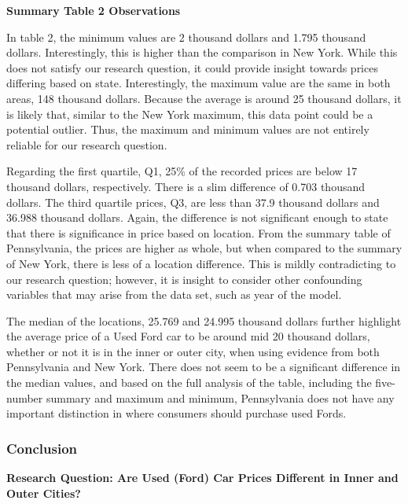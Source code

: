 \documentclass[
]{article}
\begin{document}
\textbf{Summary Table 2 Observations}

In table 2, the minimum values are 2 thousand dollars and 1.795 thousand
dollars. Interestingly, this is higher than the comparison in New York.
While this does not satisfy our research question, it could provide
insight towards prices differing based on state. Interestingly, the
maximum value are the same in both areas, 148 thousand dollars. Because
the average is around 25 thousand dollars, it is likely that, similar to
the New York maximum, this data point could be a potential outlier.
Thus, the maximum and minimum values are not entirely reliable for our
research question.

Regarding the first quartile, Q1, 25\% of the recorded prices are below
17 thousand dollars, respectively. There is a slim difference of 0.703
thousand dollars. The third quartile prices, Q3, are less than 37.9
thousand dollars and 36.988 thousand dollars. Again, the difference is
not significant enough to state that there is significance in price
based on location. From the summary table of Pennsylvania, the prices
are higher as whole, but when compared to the summary of New York, there
is less of a location difference. This is mildly contradicting to our
research question; however, it is insight to consider other confounding
variables that may arise from the data set, such as year of the model.

The median of the locations, 25.769 and 24.995 thousand dollars further
highlight the average price of a Used Ford car to be around mid 20
thousand dollars, whether or not it is in the inner or outer city, when
using evidence from both Pennsylvania and New York. There does not seem
to be a significant difference in the median values, and based on the
full analysis of the table, including the five-number summary and
maximum and minimum, Pennsylvania does not have any important
distinction in where consumers should purchase used Fords.

\hypertarget{conclusion}{%
\subsubsection{\texorpdfstring{\textbf{Conclusion}}{Conclusion}}\label{conclusion}}

\textbf{Research Question: Are Used (Ford) Car Prices Different in Inner
and Outer Cities?}
\end{document}
